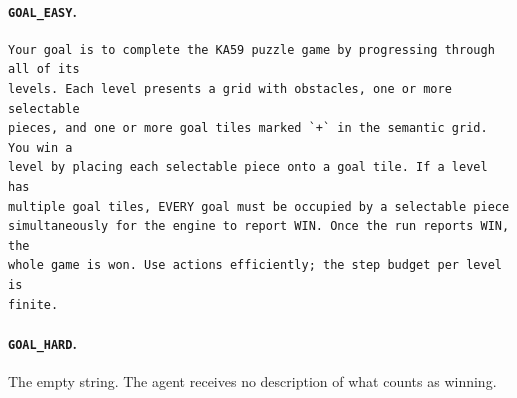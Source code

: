 \documentclass{article}
\begin{document}
\paragraph{\texttt{GOAL\_EASY}.}
\begin{verbatim}
Your goal is to complete the KA59 puzzle game by progressing through all of its
levels. Each level presents a grid with obstacles, one or more selectable
pieces, and one or more goal tiles marked `+` in the semantic grid. You win a
level by placing each selectable piece onto a goal tile. If a level has
multiple goal tiles, EVERY goal must be occupied by a selectable piece
simultaneously for the engine to report WIN. Once the run reports WIN, the
whole game is won. Use actions efficiently; the step budget per level is
finite.
\end{verbatim}

\paragraph{\texttt{GOAL\_HARD}.}
The empty string. The agent receives no description of what counts as winning.
\end{document}
